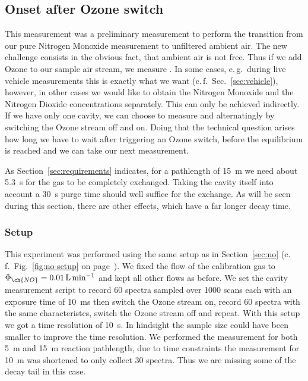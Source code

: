 \subsection{Onset after Ozone switch}
\label{sec:switch}

This measurement was a preliminary measurement to perform the 
transition from our pure Nitrogen Monoxide measurement to unfiltered
ambient air. The new challenge consists in the obvious fact, that
ambient air is not  free. Thus if we add Ozone to our sample
air stream, we measure . In some cases, e.\,g.\
during live vehicle measurements this is exactly what we want
(c.\,f.~Sec.~\ref{sec:vehicle}), however, in other cases we would like
to obtain the Nitrogen Monoxide and the Nitrogen Dioxide
concentrations separately. This can only be achieved indirectly. If
we have only one cavity, we can choose to measure \ch{NO2} and
 alternatingly by switching the Ozone stream off and
on. Doing that the technical question arises how long we have to wait
after triggering an Ozone switch, before the equilibrium is reached
and we can take our next measurement.

As Section~\ref{sec:requirements} indicates, for a pathlength of
\SI{15}{\meter} we need about \SI{5.3}{\second} for the gas to be
completely exchanged. Taking the cavity itself into account a
\SI{30}{\second} purge time should well suffice for the exchange. As
will be seen during this section, there are other effects, which have
a far longer decay time.

\subsubsection{Setup}
\label{sec:switch-setup}

This experiment was performed using the same setup as in
Section~\ref{sec:no} (c.\,f.\ Fig.~\ref{fig:no-setup} on
page~\pageref{fig:no-setup}). We fixed the flow of the 
calibration gas to $\Phi_{\ch{NO}} = \SI{0.01}{\liter\per\minute}$ and
kept all other flows as before. We set the cavity measurement script
to record 60 spectra sampled over 1000 scans each with an exposure
time of \SI{10}{\milli\second} then switch the Ozone stream on, record
60 spectra with the same characteristcs, switch the Ozone stream off
and repeat. With this setup we got a time resolution of
\SI{10}{\second}. In hindsight the sample size could have been
smaller to improve the time resolution. We performed the measurement
for both \SI{5}{\meter} and \SI{15}{\meter} reaction pathlength, due
to time constraints the measurement for \SI{10}{\meter} was shortened
to only collect 30 spectra. Thus we are missing some of the decay tail
in this case.

